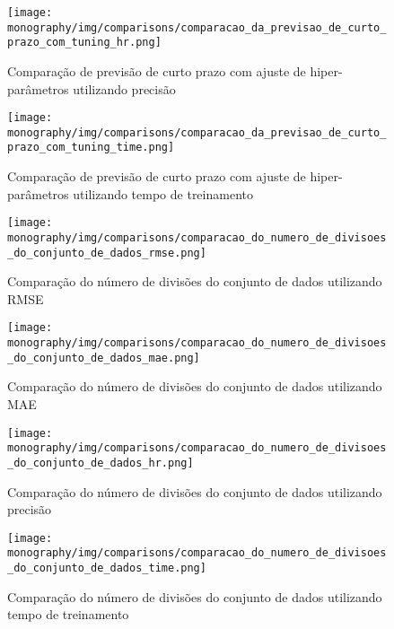 \begin{figure}[htbp]
    \centering
    \texttt{[image: monography/img/comparisons/comparacao\_da\_previsao\_de\_curto\_prazo\_com\_tuning\_hr.png]}
    \label{figure:previsao_de_curto_prazo_com_tuning_hr}
    \caption{Comparação de previsão de curto prazo com ajuste de hiper-parâmetros utilizando precisão}
\end{figure}

\begin{figure}[htbp]
    \centering
    \texttt{[image: monography/img/comparisons/comparacao\_da\_previsao\_de\_curto\_prazo\_com\_tuning\_time.png]}
    \label{figure:previsao_de_curto_prazo_com_tuning_time}
    \caption{Comparação de previsão de curto prazo com ajuste de hiper-parâmetros utilizando tempo de treinamento}
\end{figure}


\begin{figure}[htbp]
    \centering
    \texttt{[image: monography/img/comparisons/comparacao\_do\_numero\_de\_divisoes\_do\_conjunto\_de\_dados\_rmse.png]}
    \label{figure:numero_de_divisoes_do_conjunto_de_dados_rmse}
    \caption{Comparação do número de divisões do conjunto de dados utilizando RMSE}
\end{figure}

\begin{figure}[htbp]
    \centering
    \texttt{[image: monography/img/comparisons/comparacao\_do\_numero\_de\_divisoes\_do\_conjunto\_de\_dados\_mae.png]}
    \label{figure:numero_de_divisoes_do_conjunto_de_dados_mae}
    \caption{Comparação do número de divisões do conjunto de dados utilizando MAE}
\end{figure}

\begin{figure}[htbp]
    \centering
    \texttt{[image: monography/img/comparisons/comparacao\_do\_numero\_de\_divisoes\_do\_conjunto\_de\_dados\_hr.png]}
    \label{figure:numero_de_divisoes_do_conjunto_de_dados_hr}
    \caption{Comparação do número de divisões do conjunto de dados utilizando precisão}
\end{figure}

\begin{figure}[htbp]
    \centering
    \texttt{[image: monography/img/comparisons/comparacao\_do\_numero\_de\_divisoes\_do\_conjunto\_de\_dados\_time.png]}
    \label{figure:numero_de_divisoes_do_conjunto_de_dados_time}
    \caption{Comparação do número de divisões do conjunto de dados utilizando tempo de treinamento}
\end{figure}

